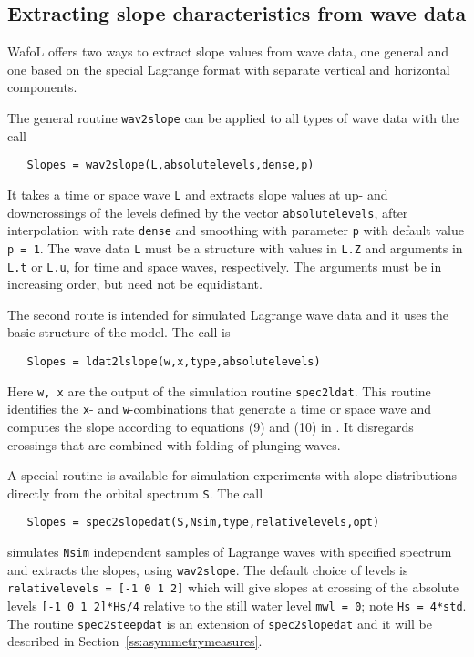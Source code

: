 \subsection{Extracting slope characteristics from wave data}\label{ss:extracting}
{\sc Wafo}L offers two ways to extract slope values from wave data, one general and one based on the special Lagrange format with separate vertical and horizontal components.

The general routine
{\tt wav2slope} can be applied to all types of wave data with the call
{\small\begin{verbatim}
   Slopes = wav2slope(L,absolutelevels,dense,p)
\end{verbatim}
}
\noindent
It takes a time or space wave {\tt L} and extracts slope values at  up- and downcrossings of the levels defined by the vector {\tt absolutelevels}, after interpolation with rate {\tt dense} and smoothing with parameter {\tt p} with default value {\tt p = 1}. The wave data {\tt L} must be a structure with values in {\tt L.Z} and arguments in {\tt L.t} or {\tt L.u}, for time and space waves, respectively. The arguments must be in increasing order, but need not be equidistant.

The second route is intended for simulated Lagrange wave data and it uses the basic structure of the model. The call is
{\small\begin{verbatim}
   Slopes = ldat2lslope(w,x,type,absolutelevels)
\end{verbatim}}
\noindent Here {\tt w, x} are the output of the simulation routine {\tt spec2ldat}. This routine identifies the {\tt x}- and {\tt w}-combinations that generate a time or space wave and computes the slope according to
equations (9) and (10) in \cite{Lindgren2010Slope}. It disregards crossings that are combined with folding of plunging waves.

A special routine is available for simulation experiments with slope distributions directly from the orbital spectrum {\tt S}.  The call
{\small\begin{verbatim}
   Slopes = spec2slopedat(S,Nsim,type,relativelevels,opt)
\end{verbatim}}
\noindent simulates {\tt Nsim} independent samples of Lagrange waves with specified spectrum and extracts the slopes, using {\tt wav2slope}.
The default choice of levels is {\tt relativelevels = [-1 0 1 2]}
which will give slopes at crossing of the absolute levels {\tt [-1 0 1 2]*Hs/4}
relative to the still water level {\tt mwl = 0}; note {\tt Hs = 4*std}.
The routine {\tt spec2steepdat} is an extension of {\tt spec2slopedat} and it will be described in
Section~\ref{ss:asymmetrymeasures}.

